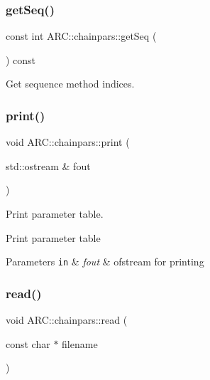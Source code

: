\subsubsection{\texorpdfstring{get\+Seq()}{getSeq()}}
{\footnotesize\ttfamily const int A\+R\+C\+::chainpars\+::get\+Seq (\begin{DoxyParamCaption}{ }\end{DoxyParamCaption}) const\hspace{0.3cm}{\ttfamily [inline]}}



Get sequence method indices. 

\hypertarget{classARC_1_1chainpars_a3bd667353d49614c52ad6c965a7480f3}{}\label{classARC_1_1chainpars_a3bd667353d49614c52ad6c965a7480f3} 
\subsubsection{\texorpdfstring{print()}{print()}}
{\footnotesize\ttfamily void A\+R\+C\+::chainpars\+::print (\begin{DoxyParamCaption}\item[{std\+::ostream \&}]{fout }\end{DoxyParamCaption})\hspace{0.3cm}{\ttfamily [inline]}}



Print parameter table. 

Print parameter table 
\begin{DoxyParams}[1]{Parameters}
\mbox{\tt in}  & {\em fout} & ofstream for printing \\
\hline
\end{DoxyParams}
\hypertarget{classARC_1_1chainpars_a68f92497bf003803c01fee179d0db68f}{}\label{classARC_1_1chainpars_a68f92497bf003803c01fee179d0db68f} 
\subsubsection{\texorpdfstring{read()}{read()}}
{\footnotesize\ttfamily void A\+R\+C\+::chainpars\+::read (\begin{DoxyParamCaption}\item[{const char $\ast$}]{filename }\end{DoxyParamCaption})\hspace{0.3cm}{\ttfamily [inline]}}



